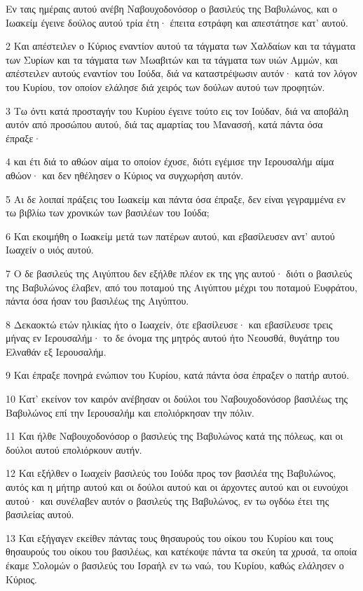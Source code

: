 \par Εν ταις ημέραις αυτού ανέβη Ναβουχοδονόσορ ο βασιλεύς της Βαβυλώνος, και ο Ιωακείμ έγεινε δούλος αυτού τρία έτη· έπειτα εστράφη και απεστάτησε κατ' αυτού.
\par 2 Και απέστειλεν ο Κύριος εναντίον αυτού τα τάγματα των Χαλδαίων και τα τάγματα των Συρίων και τα τάγματα των Μωαβιτών και τα τάγματα των υιών Αμμών, και απέστειλεν αυτούς εναντίον του Ιούδα, διά να καταστρέψωσιν αυτόν· κατά τον λόγον του Κυρίου, τον οποίον ελάλησε διά χειρός των δούλων αυτού των προφητών.
\par 3 Τω όντι κατά προσταγήν του Κυρίου έγεινε τούτο εις τον Ιούδαν, διά να αποβάλη αυτόν από προσώπου αυτού, διά τας αμαρτίας του Μανασσή, κατά πάντα όσα έπραξε·
\par 4 και έτι διά το αθώον αίμα το οποίον έχυσε, διότι εγέμισε την Ιερουσαλήμ αίμα αθώον· και δεν ηθέλησεν ο Κύριος να συγχωρήση αυτόν.
\par 5 Αι δε λοιπαί πράξεις του Ιωακείμ και πάντα όσα έπραξε, δεν είναι γεγραμμένα εν τω βιβλίω των χρονικών των βασιλέων του Ιούδα;
\par 6 Και εκοιμήθη ο Ιωακείμ μετά των πατέρων αυτού, και εβασίλευσεν αντ' αυτού Ιωαχείν ο υιός αυτού.
\par 7 Ο δε βασιλεύς της Αιγύπτου δεν εξήλθε πλέον εκ της γης αυτού· διότι ο βασιλεύς της Βαβυλώνος έλαβεν, από του ποταμού της Αιγύπτου μέχρι του ποταμού Ευφράτου, πάντα όσα ήσαν του βασιλέως της Αιγύπτου.
\par 8 Δεκαοκτώ ετών ηλικίας ήτο ο Ιωαχείν, ότε εβασίλευσε· και εβασίλευσε τρεις μήνας εν Ιερουσαλήμ· το δε όνομα της μητρός αυτού ήτο Νεουσθά, θυγάτηρ του Ελναθάν εξ Ιερουσαλήμ.
\par 9 Και έπραξε πονηρά ενώπιον του Κυρίου, κατά πάντα όσα έπραξεν ο πατήρ αυτού.
\par 10 Κατ' εκείνον τον καιρόν ανέβησαν οι δούλοι του Ναβουχοδονόσορ βασιλέως της Βαβυλώνος επί την Ιερουσαλήμ και επολιόρκησαν την πόλιν.
\par 11 Και ήλθε Ναβουχοδονόσορ ο βασιλεύς της Βαβυλώνος κατά της πόλεως, και οι δούλοι αυτού επολιόρκουν αυτήν.
\par 12 Και εξήλθεν ο Ιωαχείν βασιλεύς του Ιούδα προς τον βασιλέα της Βαβυλώνος, αυτός και η μήτηρ αυτού και οι δούλοι αυτού και οι άρχοντες αυτού και οι ευνούχοι αυτού· και συνέλαβεν αυτόν ο βασιλεύς της Βαβυλώνος, εν τω ογδόω έτει της βασιλείας αυτού.
\par 13 Και εξήγαγεν εκείθεν πάντας τους θησαυρούς του οίκου του Κυρίου και τους θησαυρούς του οίκου του βασιλέως, και κατέκοψε πάντα τα σκεύη τα χρυσά, τα οποία έκαμε Σολομών ο βασιλεύς του Ισραήλ εν τω ναώ, του Κυρίου, καθώς ελάλησεν ο Κύριος.
